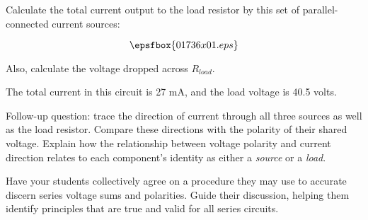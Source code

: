 

Calculate the total current output to the load resistor by this set of parallel-connected current sources:

$$\epsfbox{01736x01.eps}$$

Also, calculate the voltage dropped across $R_{load}$.







The total current in this circuit is 27 mA, and the load voltage is 40.5 volts.

\vskip 10pt

Follow-up question: trace the direction of current through all three sources as well as the load resistor.  Compare these directions with the polarity of their shared voltage.  Explain how the relationship between voltage polarity and current direction relates to each component's identity as either a {\it source} or a {\it load}.







Have your students collectively agree on a procedure they may use to accurate discern series voltage sums and polarities.  Guide their discussion, helping them identify principles that are true and valid for all series circuits.





